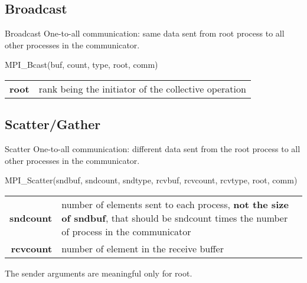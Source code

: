 \documentclass[aspectratio=43]{beamer}
\begin{document}
\subsection{Broadcast}
\begin{frame}[fragile]{Broadcast}
One-to-all communication: same data sent from root process to all other processes in the communicator.\\
\begin{Pseudolisting}[]{}
MPI_Bcast(buf, count, type, root, comm)
\end{Pseudolisting}
\begin{black1block}{}
\begin{tabular}{rp{8cm}}
\textbf{root} & rank being the initiator of the collective operation\\
\end{tabular}
\end{black1block}
\end{frame}

\subsection{Scatter/Gather}

\begin{frame}[fragile]{Scatter}
One-to-all communication: different data sent from the root process to all other processes in the communicator.\\
\begin{Pseudolisting}[]{}
MPI_Scatter(sndbuf, sndcount, sndtype,
            rcvbuf, rcvcount, rcvtype, root, comm)
\end{Pseudolisting}
\begin{black1block}{}
\begin{tabular}{rp{8cm}}
    \textbf{sndcount} & number of elements sent to each process, {\textbf{not the size of sndbuf}}, that should be sndcount times the number of process in the communicator\\
\textbf{rcvcount} & number of element in the receive buffer\\
\end{tabular}
\end{black1block}
The sender arguments are meaningful only for root.
\end{frame}
\end{document}
